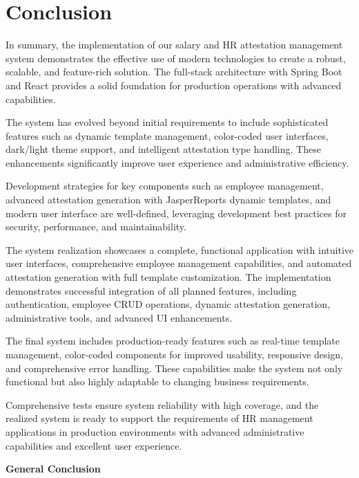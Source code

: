 \documentclass[a4paper,12pt]{report}
\begin{document}
\section{Conclusion}
\begin{doublespace}
\hspace{1cm}In summary, the implementation of our salary and HR attestation management system demonstrates the effective use of modern technologies to create a robust, scalable, and feature-rich solution. The full-stack architecture with Spring Boot and React provides a solid foundation for production operations with advanced capabilities.

The system has evolved beyond initial requirements to include sophisticated features such as dynamic template management, color-coded user interfaces, dark/light theme support, and intelligent attestation type handling. These enhancements significantly improve user experience and administrative efficiency.

Development strategies for key components such as employee management, advanced attestation generation with JasperReports dynamic templates, and modern user interface are well-defined, leveraging development best practices for security, performance, and maintainability.

The system realization showcases a complete, functional application with intuitive user interfaces, comprehensive employee management capabilities, and automated attestation generation with full template customization. The implementation demonstrates successful integration of all planned features, including authentication, employee CRUD operations, dynamic attestation generation, administrative tools, and advanced UI enhancements.

The final system includes production-ready features such as real-time template management, color-coded components for improved usability, responsive design, and comprehensive error handling. These capabilities make the system not only functional but also highly adaptable to changing business requirements.

Comprehensive tests ensure system reliability with high coverage, and the realized system is ready to support the requirements of HR management applications in production environments with advanced administrative capabilities and excellent user experience.
\end{doublespace}

\cleardoublepage
{}
{}
\begin{center}
\vspace{9cm}
    \textbf{\huge{General Conclusion}}
\end{center}
\end{document}
